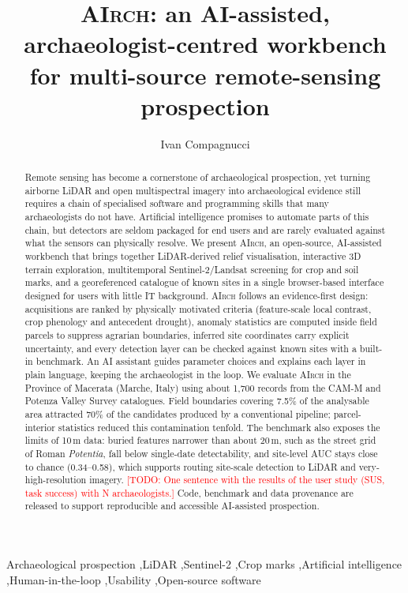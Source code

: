 \documentclass[preprint,12pt,authoryear]{elsarticle}
\newcommand{\airch}{\textsc{AIrch}}
\newcommand{\todo}[1]{\textcolor{red}{[TODO: #1]}}
\begin{document}
\begin{frontmatter}

\title{\airch: an AI-assisted, archaeologist-centred workbench for multi-source remote-sensing prospection}

\author[aff1]{Ivan Compagnucci}
\ead{\todo{email}}
\affiliation[aff1]{organization={\todo{Affiliation}},
            city={\todo{City}},
            country={Italy}}

\begin{abstract}
Remote sensing has become a cornerstone of archaeological prospection, yet turning airborne LiDAR and open multispectral imagery into archaeological evidence still requires a chain of specialised software and programming skills that many archaeologists do not have. Artificial intelligence promises to automate parts of this chain, but detectors are seldom packaged for end users and are rarely evaluated against what the sensors can physically resolve. We present \airch, an open-source, AI-assisted workbench that brings together LiDAR-derived relief visualisation, interactive 3D terrain exploration, multitemporal Sentinel-2/Landsat screening for crop and soil marks, and a georeferenced catalogue of known sites in a single browser-based interface designed for users with little IT background. \airch{} follows an evidence-first design: acquisitions are ranked by physically motivated criteria (feature-scale local contrast, crop phenology and antecedent drought), anomaly statistics are computed inside field parcels to suppress agrarian boundaries, inferred site coordinates carry explicit uncertainty, and every detection layer can be checked against known sites with a built-in benchmark. An AI assistant guides parameter choices and explains each layer in plain language, keeping the archaeologist in the loop. We evaluate \airch{} in the Province of Macerata (Marche, Italy) using about 1,700 records from the CAM-M and Potenza Valley Survey catalogues. Field boundaries covering 7.5\% of the analysable area attracted 70\% of the candidates produced by a conventional pipeline; parcel-interior statistics reduced this contamination tenfold. The benchmark also exposes the limits of 10\,m data: buried features narrower than about 20\,m, such as the street grid of Roman \textit{Potentia}, fall below single-date detectability, and site-level AUC stays close to chance (0.34--0.58), which supports routing site-scale detection to LiDAR and very-high-resolution imagery. \todo{One sentence with the results of the user study (SUS, task success) with N archaeologists.} Code, benchmark and data provenance are released to support reproducible and accessible AI-assisted prospection.
\end{abstract}

\begin{keyword}
Archaeological prospection \sep LiDAR \sep Sentinel-2 \sep Crop marks \sep Artificial intelligence \sep Human-in-the-loop \sep Usability \sep Open-source software
\end{keyword}

\end{frontmatter}
\end{document}
